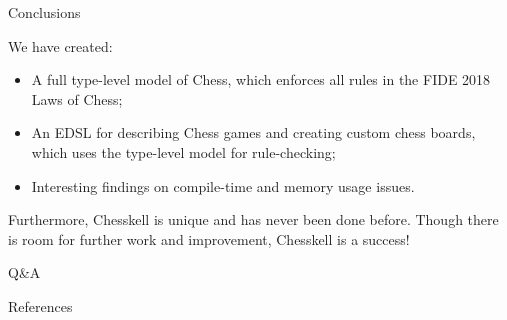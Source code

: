 \documentclass{beamer}
\begin{document}
\begin{frame}{Conclusions}

We have created:

\pause

\begin{itemize}
    \item<2-> A full type-level model of Chess, which enforces all rules in the FIDE 2018 Laws of Chess;
    \item<3-> An EDSL for describing Chess games and creating custom chess boards, which uses the type-level model for rule-checking;
    \item<4-> Interesting findings on compile-time and memory usage issues.
\end{itemize}

\begin{overprint}
Furthermore, Chesskell is unique and has never been done before. Though there is room for further work and improvement, Chesskell is a success!
\end{overprint}

    
\end{frame}

\begin{frame}[standout]

Q\&A
    
\end{frame}

\begin{frame}[allowframebreaks]{References}

\printbibliography
    
\end{frame}
\end{document}
